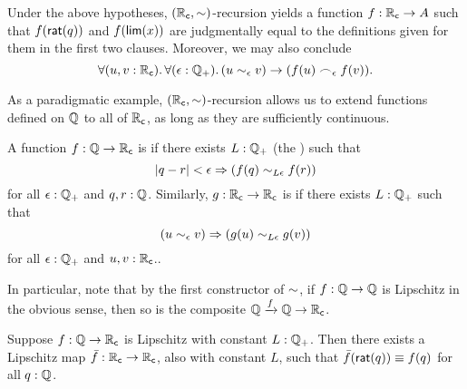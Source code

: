Under the above hypotheses, $(\mathbb{R}_\mathsf{c},\mathord\sim)$-recursion yields a function $f:\mathbb{R}_\mathsf{c}\to A$ such that $f(\mathsf{rat}(q))$ and $f(\mathsf{lim}(x))$ are judgmentally equal to the definitions given for them in the first two clauses.
Moreover, we may also conclude
\begin{equation}
  \fall{u,v:\RC}{\epsilon:\Qp} (u\close\epsilon v) \to (f(u) \bsim_\epsilon f(v)).\label{eq:RC-sim-recursion-extra}
\end{equation}

As a paradigmatic example, $(\mathbb{R}_\mathsf{c},\mathord\sim)$-recursion allows us to extend functions defined on $\mathbb{Q}$ to all of $\mathbb{R}_\mathsf{c}$, as long as they are sufficiently continuous.
%

\begin{defn}\label{defn:lipschitz}
  A function $f:\mathbb{Q}\to\mathbb{R}_\mathsf{c}$ is 
  if there exists $L:\mathbb{Q}_{+}$ (the ) such that
  \[ |q - r|<\epsilon \Rightarrow (f(q) \sim_{L\epsilon} f(r)) \]
  for all $\epsilon:\mathbb{Q}_{+}$ and $q,r:\mathbb{Q}$.
  Similarly, $g:\mathbb{R}_\mathsf{c}\to\mathbb{R}_\mathsf{c}$ is  if there exists $L:\mathbb{Q}_{+}$ such that
  \[ (u\sim_{\epsilon} v) \Rightarrow (g(u) \sim_{L\epsilon} g(v)) \]
  for all $\epsilon:\mathbb{Q}_{+}$ and $u,v:\mathbb{R}_\mathsf{c}$..
\end{defn}

In particular, note that by the first constructor of $\mathord\sim$, if $f:\mathbb{Q}\to\mathbb{Q}$ is Lipschitz in the obvious sense, then so is the composite $\mathbb{Q}\xrightarrow{f} \mathbb{Q} \to \mathbb{R}_\mathsf{c}$.

\begin{lem}\label{RC-extend-Q-Lipschitz}
  Suppose $f : \mathbb{Q} \to \mathbb{R}_\mathsf{c}$ is Lipschitz with constant $L : \mathbb{Q}_{+}$.
  Then there exists a Lipschitz map $\bar{f} : \mathbb{R}_\mathsf{c} \to \mathbb{R}_\mathsf{c}$, also with constant $L$, such that $\bar{f}(\mathsf{rat}(q)) \equiv f(q)$ for all $q:\mathbb{Q}$.
\end{lem}

